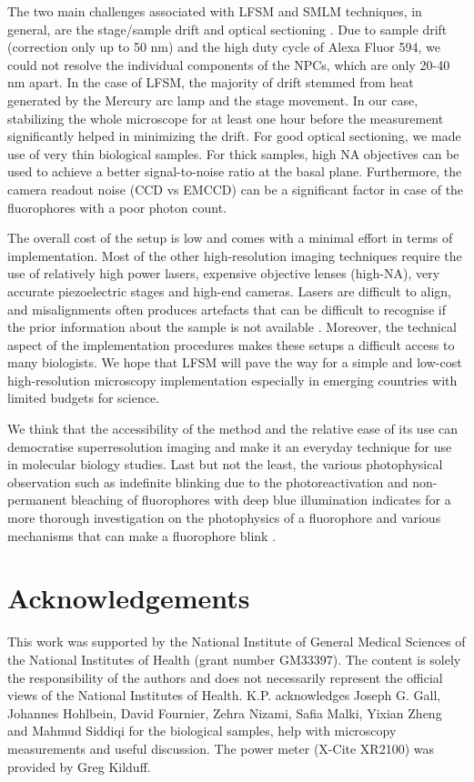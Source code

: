\documentclass[9pt,twocolumn,twoside]{pnas-new}
\begin{document}
The two main challenges associated with LFSM and SMLM techniques, in general, are the stage/sample drift and optical sectioning \citep{betzig2006,juette2008three}. Due to sample drift (correction only up to 50 nm) and the high duty cycle of Alexa Fluor 594, we could not resolve the individual components of the NPCs, which are only 20-40 nm apart. In the case of LFSM, the majority of drift stemmed from heat generated by the Mercury arc lamp and the stage movement. In our case, stabilizing the whole microscope for at least one hour before the measurement significantly helped in minimizing the drift. For good optical sectioning, we made use of very thin biological samples. For thick samples, high NA objectives can be used to achieve a better signal-to-noise ratio at the basal plane. Furthermore, the camera readout noise (CCD vs EMCCD) can be a significant factor in case of the fluorophores with a poor photon count.  

The overall cost of the setup is low and comes with a minimal effort in terms of implementation. Most of the other high-resolution imaging techniques require the use of relatively high power lasers, expensive objective lenses (high-NA), very accurate piezoelectric stages and high-end cameras. Lasers are difficult to align, and misalignments often produces artefacts that can be difficult to recognise if the prior information about the sample is not available \citep{prakash2017investigating}. Moreover, the technical aspect of the implementation procedures makes these setups a difficult access to many biologists. We hope that LFSM will pave the way for a simple and low-cost high-resolution microscopy implementation especially in emerging countries with limited budgets for science.

We think that the accessibility of the method and the relative ease of its use can democratise superresolution imaging and make it an everyday technique for use in molecular biology studies. Last but not the least, the various photophysical observation such as indefinite blinking due to the photoreactivation and non-permanent bleaching of fluorophores with deep blue illumination indicates for a more thorough investigation on the photophysics of a fluorophore \citep{lippincott2003photobleaching, lippincott2008fluorescent} and various mechanisms that can make a fluorophore blink \citep{vogelsang2010make}. 


\section*{Acknowledgements}
This work was supported by the National Institute of General Medical Sciences of the National Institutes of Health (grant number GM33397). The content is solely the responsibility of the authors and does not necessarily represent the official views of the National Institutes of Health. K.P. acknowledges Joseph G. Gall, Johannes Hohlbein, David Fournier, Zehra Nizami, Safia Malki, Yixian Zheng and Mahmud Siddiqi for the biological samples, help with microscopy measurements and useful discussion. The power meter (X-Cite XR2100) was provided by Greg Kilduff. 
\end{document}
